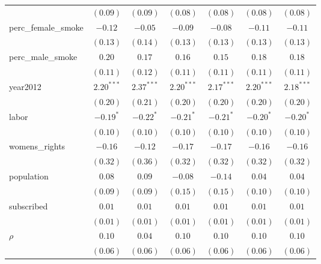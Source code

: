 \begin{table}[!h]
\begin{center}
\begin{tabular}{l c c c c c c }
                        & $(0.09)$     & $(0.09)$     & $(0.08)$     & $(0.08)$     & $(0.08)$     & $(0.08)$     \\
perc\_female\_smoke     & $-0.12$      & $-0.05$      & $-0.09$      & $-0.08$      & $-0.11$      & $-0.11$      \\
                        & $(0.13)$     & $(0.14)$     & $(0.13)$     & $(0.13)$     & $(0.13)$     & $(0.13)$     \\
perc\_male\_smoke       & $0.20$       & $0.17$       & $0.16$       & $0.15$       & $0.18$       & $0.18$       \\
                        & $(0.11)$     & $(0.12)$     & $(0.11)$     & $(0.11)$     & $(0.11)$     & $(0.11)$     \\
year2012                & $2.20^{***}$ & $2.37^{***}$ & $2.20^{***}$ & $2.17^{***}$ & $2.20^{***}$ & $2.18^{***}$ \\
                        & $(0.20)$     & $(0.21)$     & $(0.20)$     & $(0.20)$     & $(0.20)$     & $(0.20)$     \\
labor                   & $-0.19^{*}$  & $-0.22^{*}$  & $-0.21^{*}$  & $-0.21^{*}$  & $-0.20^{*}$  & $-0.20^{*}$  \\
                        & $(0.10)$     & $(0.10)$     & $(0.10)$     & $(0.10)$     & $(0.10)$     & $(0.10)$     \\
womens\_rights          & $-0.16$      & $-0.12$      & $-0.17$      & $-0.17$      & $-0.16$      & $-0.16$      \\
                        & $(0.32)$     & $(0.36)$     & $(0.32)$     & $(0.32)$     & $(0.32)$     & $(0.32)$     \\
population              & $0.08$       & $0.09$       & $-0.08$      & $-0.14$      & $0.04$       & $0.04$       \\
                        & $(0.09)$     & $(0.09)$     & $(0.15)$     & $(0.15)$     & $(0.10)$     & $(0.10)$     \\
subscribed              & $0.01$       & $0.01$       & $0.01$       & $0.01$       & $0.01$       & $0.01$       \\
                        & $(0.01)$     & $(0.01)$     & $(0.01)$     & $(0.01)$     & $(0.01)$     & $(0.01)$     \\
$\rho$                  & $0.10$       & $0.04$       & $0.10$       & $0.10$       & $0.10$       & $0.10$       \\
                        & $(0.06)$     & $(0.06)$     & $(0.06)$     & $(0.06)$     & $(0.06)$     & $(0.06)$     \\

\end{tabular}
\end{center}
\end{table}
